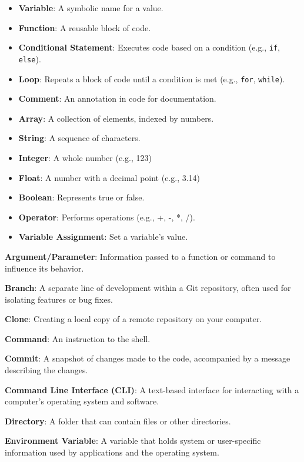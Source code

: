 \documentclass[9pt]{cheatsheet}
\begin{document}
\begin{multicols*}{3}

\begin{itemize}
  \item \textbf{Variable}: A symbolic name for a value.
  \item \textbf{Function}: A reusable block of code.
  \item \textbf{Conditional Statement}: Executes code based on a condition (e.g., \texttt{if}, \texttt{else}).
  \item \textbf{Loop}: Repeats a block of code until a condition is met (e.g., \texttt{for}, \texttt{while}).
  \item \textbf{Comment}: An annotation in code for documentation.
  \item \textbf{Array}: A collection of elements, indexed by numbers.
  \item \textbf{String}: A sequence of characters.
  \item \textbf{Integer}: A whole number (e.g., 123)
  \item \textbf{Float}: A number with a decimal point (e.g., 3.14)
  \item \textbf{Boolean}: Represents true or false.
  \item \textbf{Operator}: Performs operations (e.g., +, -, *, /).
  \item \textbf{Variable Assignment}: Set a variable's value.
\end{itemize}


\textbf{Argument/Parameter}: Information passed to a function or command to influence its behavior.

\textbf{Branch}: A separate line of development within a Git repository, often used for isolating features or bug fixes.

\textbf{Clone}: Creating a local copy of a remote repository on your computer.

\textbf{Command}: An instruction to the shell.

\textbf{Commit}: A snapshot of changes made to the code, accompanied by a message describing the changes.

\textbf{Command Line Interface (CLI)}: A text-based interface for interacting with a computer's operating system and software.

\textbf{Directory}: A folder that can contain files or other directories.

\textbf{Environment Variable}: A variable that holds system or user-specific information used by applications and the operating system.


\end{multicols*}
\end{document}
